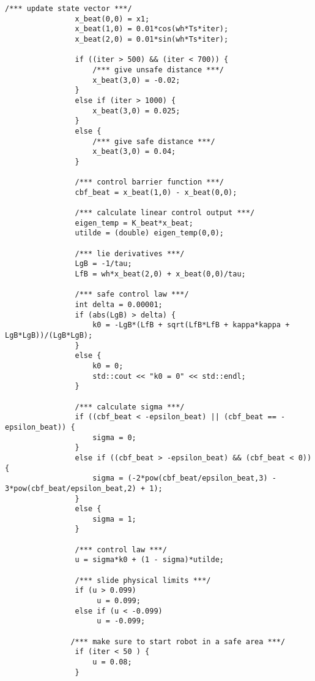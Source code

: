 \begin{lstlisting}[language=gedit]
                /*** update state vector ***/
                x_beat(0,0) = x1; 
                x_beat(1,0) = 0.01*cos(wh*Ts*iter);
                x_beat(2,0) = 0.01*sin(wh*Ts*iter);
               
                if ((iter > 500) && (iter < 700)) {
                    /*** give unsafe distance ***/
                    x_beat(3,0) = -0.02;
                }
                else if (iter > 1000) {
                    x_beat(3,0) = 0.025;
                }
                else {
                    /*** give safe distance ***/
                    x_beat(3,0) = 0.04;
                }
                
                /*** control barrier function ***/
                cbf_beat = x_beat(1,0) - x_beat(0,0);

                /*** calculate linear control output ***/
                eigen_temp = K_beat*x_beat;
                utilde = (double) eigen_temp(0,0);
            
                /*** lie derivatives ***/
                LgB = -1/tau;
                LfB = wh*x_beat(2,0) + x_beat(0,0)/tau;

                /*** safe control law ***/
                int delta = 0.00001;
                if (abs(LgB) > delta) {
                    k0 = -LgB*(LfB + sqrt(LfB*LfB + kappa*kappa + LgB*LgB))/(LgB*LgB);
                }
                else {
                    k0 = 0;
                    std::cout << "k0 = 0" << std::endl;
                }          
 
                /*** calculate sigma ***/
                if ((cbf_beat < -epsilon_beat) || (cbf_beat == -epsilon_beat)) {
                    sigma = 0;
                }
                else if ((cbf_beat > -epsilon_beat) && (cbf_beat < 0)) {
                    sigma = (-2*pow(cbf_beat/epsilon_beat,3) - 3*pow(cbf_beat/epsilon_beat,2) + 1);
                }
                else {
                    sigma = 1;
                }
               
                /*** control law ***/
                u = sigma*k0 + (1 - sigma)*utilde;

                /*** slide physical limits ***/
                if (u > 0.099)
                     u = 0.099;
                else if (u < -0.099)
                     u = -0.099;

               /*** make sure to start robot in a safe area ***/
                if (iter < 50 ) {
                    u = 0.08;
                }
 

\end{lstlisting}
